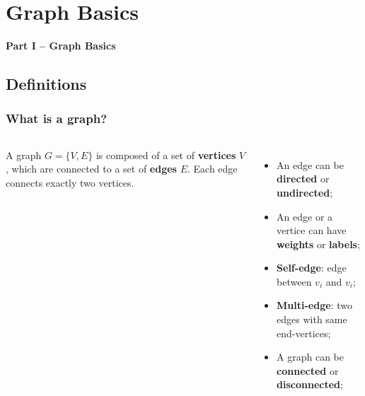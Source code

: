 

\section{Graph Basics}

\begin{frame}
  \begin{center}
    {\bf Part I -- Graph Basics}
  \end{center}
\end{frame}

\subsection{Definitions}

\begin{frame}
  \frametitle{What is a graph?}

  \begin{columns}[T]
    \begin{block}{}
      A graph $G = \{V,E\}$ is composed of a set of {\bf vertices} $V$, which are connected to a set of {\bf edges} $E$. Each edge connects exactly two vertices.
    \end{block}\bigskip

    \begin{itemize}
    \item An edge can be {\bf directed} or {\bf undirected};
    \item An edge or a vertice can have {\bf weights} or {\bf labels};
    \item {\bf Self-edge}: edge between $v_i$ and $v_i$;
    \item {\bf Multi-edge}: two edges with same end-vertices;
    \item A graph can be {\bf connected} or {\bf disconnected};
    \end{itemize}



\end{columns}
\end{frame}
